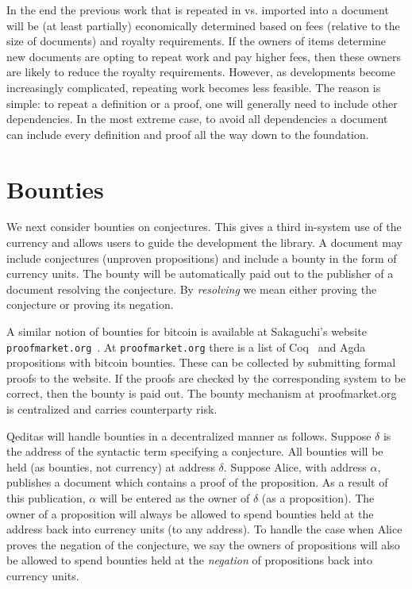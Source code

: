 \documentclass{article}
\begin{document}
In the end the previous work that is repeated in vs. imported into a document
will be (at least partially) economically determined based on fees (relative
to the size of documents) and royalty requirements.
If the owners of items determine new documents are opting to repeat work
and pay higher fees, then these owners are likely to reduce the royalty requirements.
However, as developments
become increasingly complicated, repeating work becomes less feasible. The
reason is simple: to repeat a definition or a proof, one will generally need to
include other dependencies. In the most extreme case, to avoid all dependencies a document can include every definition and proof all the way down to the foundation.

\section{Bounties}\label{sec:bounties}

We next consider bounties on conjectures.
This gives a third in-system use of the currency
and allows users to guide the development the library.
A document may include conjectures (unproven propositions)
and include a bounty in the form of currency units.
The bounty will be automatically paid out to the publisher
of a document resolving the conjecture.
By {\em{resolving}} we mean either proving the conjecture
or proving its negation.

A similar notion of bounties for bitcoin is available
at Sakaguchi's website {\tt{proofmarket.org}}~\cite{ProofMarket}.
At {\tt{proofmarket.org}} there is a list of Coq~\cite{Coq:manual} and Agda~\cite{Norell08} propositions
with bitcoin bounties. These can be collected by submitting formal proofs to
the website. If the proofs are checked by the corresponding system to be correct,
then the bounty is paid out.
The bounty mechanism at
proofmarket.org is centralized and carries counterparty risk.

Qeditas will handle bounties in a decentralized manner as follows.
Suppose $\delta$ is the address of the syntactic term specifying a conjecture.
All bounties will be held (as bounties, not currency) at address $\delta$.
Suppose Alice, with address $\alpha$, publishes a document which contains
a proof of the proposition.
As a result of this publication, $\alpha$ will be entered as the owner of $\delta$ (as a proposition).
The owner of a proposition will always be allowed to spend bounties held at the address back into currency units (to any address).
To handle the case when Alice proves the negation of the conjecture,
we say the owners of propositions will also be allowed to spend bounties
held at the {\em{negation}} of propositions
back into currency units.
\end{document}
